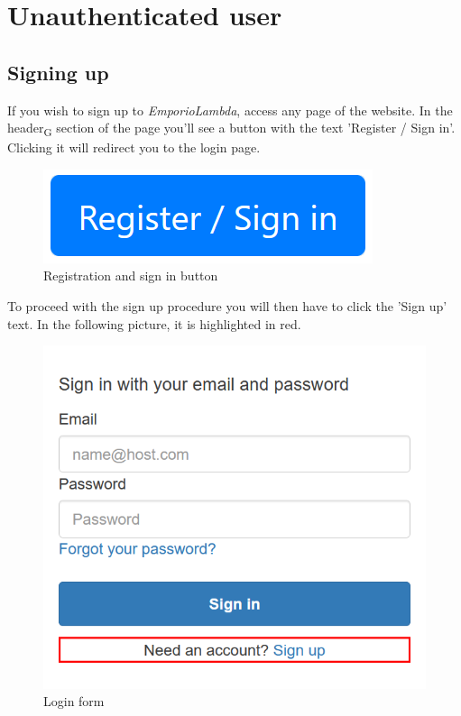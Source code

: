 \section{Unauthenticated user}
\subsection{Signing up}
If you wish to sign up to \textit{EmporioLambda}, access any page of the website. In the header\textsubscript{G} section of the page you'll see a button with the text 'Register / Sign in'. Clicking it will redirect you to the login page.

\begin{figure}[H]
\centering
\includegraphics[scale=0.6]{res/Immagini/RegisterSigninButton}
\caption{Registration and sign in button}
\end{figure}

To proceed with the sign up procedure you will then have to click the 'Sign up' text. In the following picture, it is highlighted in red.

\begin{figure}[H]
\centering
\includegraphics[scale=0.6]{res/Immagini/RegisterSigninForm}
\caption{Login form}
\end{figure}

